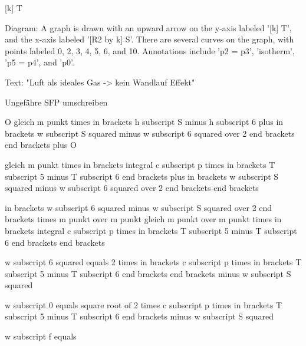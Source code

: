 [k] T

Diagram: A graph is drawn with an upward arrow on the y-axis labeled '[k] T', and the x-axis labeled '[R2 by k] S'. There are several curves on the graph, with points labeled 0, 2, 3, 4, 5, 6, and 10. Annotations include 'p2 = p3', 'isotherm', 'p5 = p4', and 'p0'.

Text: "Luft als ideales Gas -> kein Wandlauf Effekt"

Ungefähre SFP umschreiben

O gleich m punkt times in brackets h subscript S minus h subscript 6 plus in brackets w subscript S squared minus w subscript 6 squared over 2 end brackets end brackets plus O

gleich m punkt times in brackets integral c subscript p times in brackets T subscript 5 minus T subscript 6 end brackets plus in brackets w subscript S squared minus w subscript 6 squared over 2 end brackets end brackets

in brackets w subscript 6 squared minus w subscript S squared over 2 end brackets times m punkt over m punkt gleich m punkt over m punkt times in brackets integral c subscript p times in brackets T subscript 5 minus T subscript 6 end brackets end brackets

w subscript 6 squared equals 2 times in brackets c subscript p times in brackets T subscript 5 minus T subscript 6 end brackets end brackets minus w subscript S squared

w subscript 0 equals square root of 2 times c subscript p times in brackets T subscript 5 minus T subscript 6 end brackets minus w subscript S squared

w subscript f equals